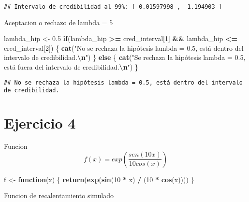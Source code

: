 \documentclass[
]{article}
\newenvironment{Shaded}{\begin{snugshade}}{\end{snugshade}}
\newcommand{\ControlFlowTok}[1]{\textcolor[rgb]{0.13,0.29,0.53}{\textbf{#1}}}
\newcommand{\DecValTok}[1]{\textcolor[rgb]{0.00,0.00,0.81}{#1}}
\newcommand{\FloatTok}[1]{\textcolor[rgb]{0.00,0.00,0.81}{#1}}
\newcommand{\FunctionTok}[1]{\textcolor[rgb]{0.13,0.29,0.53}{\textbf{#1}}}
\newcommand{\NormalTok}[1]{#1}
\newcommand{\OtherTok}[1]{\textcolor[rgb]{0.56,0.35,0.01}{#1}}
\newcommand{\SpecialCharTok}[1]{\textcolor[rgb]{0.81,0.36,0.00}{\textbf{#1}}}
\newcommand{\StringTok}[1]{\textcolor[rgb]{0.31,0.60,0.02}{#1}}
\begin{document}
\begin{verbatim}
## Intervalo de credibilidad al 99%: [ 0.01597998 ,  1.194903 ]
\end{verbatim}

Aceptacion o rechazo de lambda = 5

\begin{Shaded}
\begin{Highlighting}[]
\NormalTok{lambda\_hip }\OtherTok{\textless{}{-}} \FloatTok{0.5}
\ControlFlowTok{if}\NormalTok{(lambda\_hip }\SpecialCharTok{\textgreater{}=}\NormalTok{ cred\_interval[}\DecValTok{1}\NormalTok{] }\SpecialCharTok{\&\&}\NormalTok{ lambda\_hip }\SpecialCharTok{\textless{}=}\NormalTok{ cred\_interval[}\DecValTok{2}\NormalTok{]) \{}
  \FunctionTok{cat}\NormalTok{(}\StringTok{"No se rechaza la hipótesis lambda = 0.5, está dentro del intervalo de credibilidad.}\SpecialCharTok{\textbackslash{}n}\StringTok{"}\NormalTok{)}
\NormalTok{\} }\ControlFlowTok{else}\NormalTok{ \{}
  \FunctionTok{cat}\NormalTok{(}\StringTok{"Se rechaza la hipótesis lambda = 0.5, está fuera del intervalo de credibilidad.}\SpecialCharTok{\textbackslash{}n}\StringTok{"}\NormalTok{)}
\NormalTok{\}}
\end{Highlighting}
\end{Shaded}

\begin{verbatim}
## No se rechaza la hipótesis lambda = 0.5, está dentro del intervalo de credibilidad.
\end{verbatim}

\hypertarget{ejercicio-4}{%
\section{Ejercicio 4}\label{ejercicio-4}}

Funcion \[
f(x) = exp(\frac{sen(10x)}{10cos(x)})
\]

\begin{Shaded}
\begin{Highlighting}[]
\NormalTok{f }\OtherTok{\textless{}{-}} \ControlFlowTok{function}\NormalTok{(x) \{}
  \FunctionTok{return}\NormalTok{(}\FunctionTok{exp}\NormalTok{(}\FunctionTok{sin}\NormalTok{(}\DecValTok{10} \SpecialCharTok{*}\NormalTok{ x) }\SpecialCharTok{/}\NormalTok{ (}\DecValTok{10} \SpecialCharTok{*} \FunctionTok{cos}\NormalTok{(x))))}
\NormalTok{\}}
\end{Highlighting}
\end{Shaded}

Funcion de recalentamiento simulado
\end{document}
